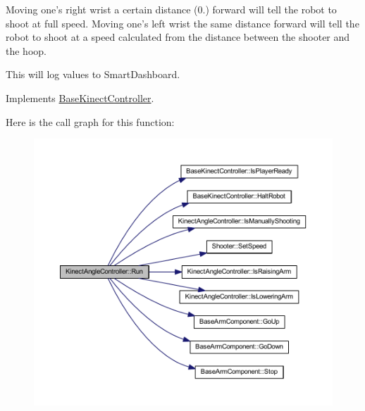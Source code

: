 \-Moving one's right wrist a certain distance (0.) forward will tell the robot to shoot at full speed. \-Moving one's left wrist the same distance forward will tell the robot to shoot at a speed calculated from the distance between the shooter and the hoop.

\-This will log values to \-Smart\-Dashboard. 

\-Implements \hyperlink{class_base_kinect_controller_a14c4e3ec8d0f785204c84b06c745b200}{\-Base\-Kinect\-Controller}.



\-Here is the call graph for this function\-:\nopagebreak
\begin{figure}[H]
\begin{center}
\leavevmode
\includegraphics[width=350pt]{class_kinect_angle_controller_a530d70a40efe4bf2f9536e641805b137_cgraph}
\end{center}
\end{figure}




